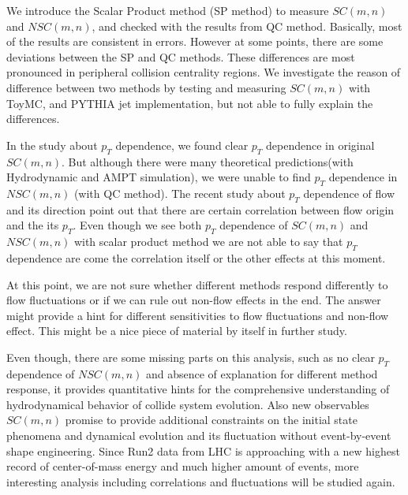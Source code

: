 We introduce the Scalar Product method (SP method) to measure $SC(m,n)$ and  $NSC(m,n)$, and checked with the results from QC method. Basically, most of the results are consistent in errors. However at some points, there are some deviations between the SP and QC methods. These differences are most pronounced in peripheral collision centrality regions. We investigate the reason of difference between two methods by testing and measuring $SC(m,n)$ with ToyMC, and PYTHIA jet implementation, but not able to fully explain the differences. 

In the study about $p_T$ dependence, we found clear $p_T$ dependence in original $SC(m,n)$. But although there were many theoretical predictions(with Hydrodynamic and AMPT simulation), we were unable to find $p_T$ dependence in  $NSC(m,n)$ (with QC method). The recent study about $p_T$ dependence of flow and its direction point out that there are certain correlation between flow origin and the its $p_T$. Even though we see  both $p_T$ dependence of $SC(m,n)$ and  $NSC(m,n)$ with scalar product method we are not able to say that $p_T$ dependence are come the correlation itself or the other effects at this moment.

At this point, we are not sure whether different methods respond differently to flow fluctuations or if we can rule out non-flow effects in the end. The answer might provide a hint for different sensitivities to flow fluctuations and non-flow effect. This might be a nice piece of material by itself in further study.

Even though, there are some missing parts on this analysis, such as no clear $p_T$ dependence of  $NSC(m,n)$ and absence of explanation for different method response, it provides quantitative hints for the comprehensive understanding of hydrodynamical behavior of collide system evolution. Also  new observables $SC(m,n)$ promise to provide additional constraints on the initial state phenomena and dynamical evolution and its fluctuation without event-by-event shape engineering. Since Run2 data from LHC is approaching with a new highest record of center-of-mass energy and much higher amount of events, more interesting analysis including correlations and fluctuations will be studied again.

